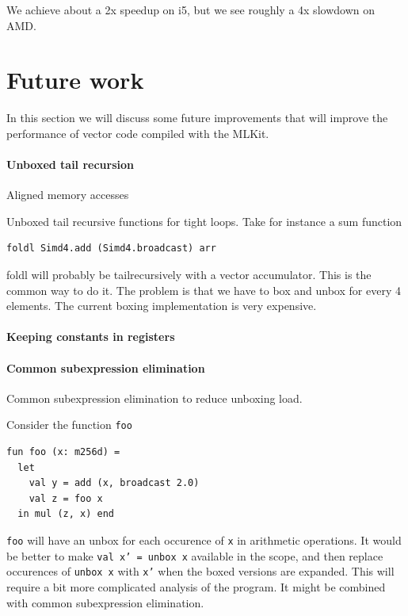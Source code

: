 \documentclass{article}
\begin{document}
We achieve about a 2x speedup on i5, but we see roughly a 4x slowdown on AMD.

\section{Future work}

In this section we will discuss some future improvements that will improve the performance of vector code compiled with the MLKit.

\paragraph{Unboxed tail recursion}

Aligned memory accesses

Unboxed tail recursive functions for tight loops. Take for instance a sum function

\begin{lstlisting}
foldl Simd4.add (Simd4.broadcast) arr
\end{lstlisting}

foldl will probably be tailrecursively with a vector accumulator. This is the common way to do it. The problem is that we have to box and unbox for every 4 elements. The current boxing implementation is very expensive.

\paragraph{Keeping constants in registers}

\paragraph{Common subexpression elimination}

Common subexpression elimination to reduce unboxing load.

Consider the function \texttt{foo}
\begin{lstlisting}
fun foo (x: m256d) =
  let
    val y = add (x, broadcast 2.0)
    val z = foo x
  in mul (z, x) end
\end{lstlisting}

\texttt{foo} will have an unbox for each occurence of \texttt{x} in arithmetic operations. It would be better to make \texttt{val x' = unbox x} available in the scope, and then replace occurences of \texttt{unbox x} with \texttt{x'} when the boxed versions are expanded. This will require a bit more complicated analysis of the program. It might be combined with common subexpression elimination.
\end{document}
